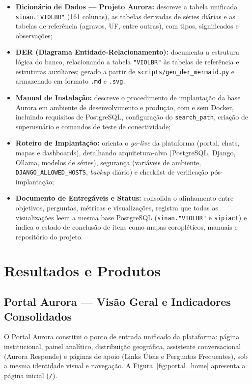 \documentclass[11pt,a4paper]{article}
\begin{document}
\begin{itemize}
  \item \textbf{Dicionário de Dados — Projeto Aurora:} descreve a tabela unificada \texttt{sinan."VIOLBR"} (161 colunas), as tabelas derivadas de séries diárias e as tabelas de referência (agravos, UF, entre outras), com tipos, significados e observações;
  \item \textbf{DER (Diagrama Entidade-Relacionamento):} documenta a estrutura lógica do banco, relacionando a tabela \texttt{"VIOLBR"} às tabelas de referência e estruturas auxiliares; gerado a partir de \texttt{scripts/gen\_der\_mermaid.py} e armazenado em formato \texttt{.md} e \texttt{.svg};
  \item \textbf{Manual de Instalação:} descreve o procedimento de implantação da base Aurora em ambiente de desenvolvimento e produção, com e sem Docker, incluindo requisitos de PostgreSQL, configuração do \texttt{search\_path}, criação de superusuário e comandos de teste de conectividade;
  \item \textbf{Roteiro de Implantação:} orienta o \emph{go-live} da plataforma (portal, chats, mapas e dashboards), detalhando arquitetura-alvo (PostgreSQL, Django, Ollama, modelos de séries), segurança (variáveis de ambiente, \texttt{DJANGO\_ALLOWED\_HOSTS}, \emph{backup} diário) e checklist de verificação pós-implantação;
  \item \textbf{Documento de Entregáveis e Status:} consolida o alinhamento entre objetivos, perguntas, métricas e visualizações, registra que todas as visualizações leem a mesma base PostgreSQL (\texttt{sinan."VIOLBR"} e \texttt{sipiact}) e indica o estado de conclusão de itens como mapas coropléticos, manuais e repositório do projeto.
\end{itemize}

\clearpage
\section{Resultados e Produtos}
\label{sec:resultados}

\subsection{Portal Aurora — Visão Geral e Indicadores Consolidados}
\label{subsec:portal}

O Portal Aurora constitui o ponto de entrada unificado da plataforma: página institucional, painel analítico, distribuição geográfica, assistente conversacional (Aurora Responde) e páginas de apoio (Links Úteis e Perguntas Frequentes), sob a mesma identidade visual e navegação. A Figura~\ref{fig:portal_home} apresenta a página inicial (\texttt{/}).
\end{document}
